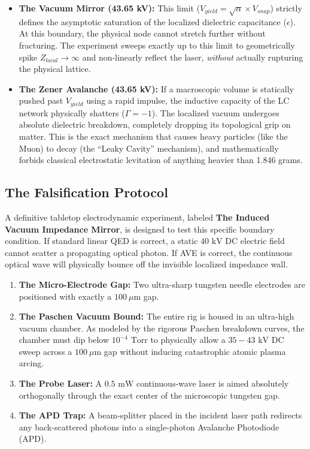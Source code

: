 \begin{itemize}
    \item \textbf{The Vacuum Mirror (43.65 kV):} This limit ($V_{yield} = \sqrt{\alpha} \times V_{snap}$) strictly defines the asymptotic saturation of the localized dielectric capacitance ($\epsilon$). At this boundary, the physical node cannot stretch further without fracturing. The experiment sweeps exactly up to this limit to geometrically spike $Z_{local} \to \infty$ and non-linearly reflect the laser, \textit{without} actually rupturing the physical lattice.
    \item \textbf{The Zener Avalanche (43.65 kV):} If a macroscopic volume is statically pushed past $V_{yield}$ using a rapid impulse, the inductive capacity of the LC network physically shatters ($\Gamma = -1$\gammaundeclared{}). The localized vacuum undergoes absolute dielectric breakdown, completely dropping its topological grip on matter. This is the exact mechanism that causes heavy particles (like the Muon) to decay (the ``Leaky Cavity'' mechanism), and mathematically forbids classical electrostatic levitation of anything heavier than 1.846 grams.
\end{itemize}

\subsection{The Falsification Protocol}
A definitive tabletop electrodynamic experiment, labeled \textbf{The Induced Vacuum Impedance Mirror}, is designed to test this specific boundary condition. If standard linear QED is correct, a static $40\text{ kV}$ DC electric field cannot scatter a propagating optical photon. If AVE is correct, the continuous optical wave will physically bounce off the invisible localized impedance wall.

\begin{enumerate}
    \item \textbf{The Micro-Electrode Gap:} Two ultra-sharp tungsten needle electrodes are positioned with exactly a $100\ \mu\text{m}$ gap. 
    \item \textbf{The Paschen Vacuum Bound:} The entire rig is housed in an ultra-high vacuum chamber. As modeled by the rigorous Paschen breakdown curves, the chamber must dip below $10^{-4}\text{ Torr}$ to physically allow a $35-43\text{ kV}$ DC sweep across a $100\ \mu\text{m}$ gap without inducing catastrophic atomic plasma arcing.
    \item \textbf{The Probe Laser:} A $0.5\text{ mW}$ continuous-wave laser is aimed absolutely orthogonally through the exact center of the microscopic tungsten gap. 
    \item \textbf{The APD Trap:} A beam-splitter placed in the incident laser path redirects any back-scattered photons into a single-photon Avalanche Photodiode (APD).
\end{enumerate}

